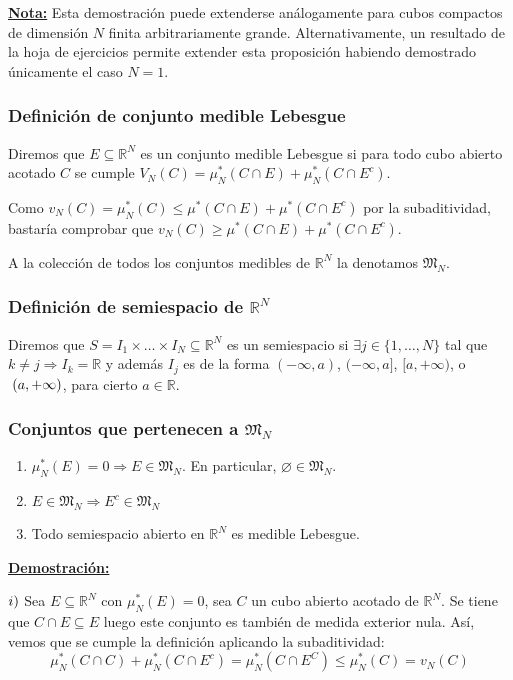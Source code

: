 \documentclass[12pt,a4paper]{article}
\newcommand{\R}{\mathbb{R}}
\newcounter{unit}[section]
\newcounter{chapter}[unit]
\renewcommand{\theunit}{\arabic{unit}}
\renewcommand{\thechapter}{\arabic{chapter}}
\renewcommand{\thesubsubsection}{\theunit.\thechapter.\arabic{subsubsection}}
\newcommand{\result}[1]{%
  \subsubsection{#1}%
  \label{result:\thesubsubsection}
}
\newcommand{\dem}{
    \noindent \underline{\textbf{Demostración:}}
}
\newcommand{\nota}{
    \noindent \underline{\textbf{Nota:}}
}
\begin{document}
\vspace{6mm} %
\nota Esta demostración puede extenderse análogamente para cubos compactos de dimensión $N$ finita arbitrariamente grande. Alternativamente, un resultado de la hoja de ejercicios permite extender esta proposición habiendo demostrado únicamente el caso $N=1$.

\newpage
\result{Definición de conjunto medible Lebesgue}
\hspace{3mm}
Diremos que $E \subseteq \R^N$ es un conjunto medible Lebesgue si para todo cubo abierto acotado $C$ se cumple 
$ V_N(C) = \mu^*_N(C \cap E) + \mu^*_N(C \cap E^c)$.

\vspace{4mm}
Como $v_N(C) = \mu^*_N (C) \leq \mu^*(C \cap E) + \mu^*(C \cap E^c)$ por la subaditividad, bastaría comprobar que $v_N(C) \geq \mu^*(C \cap E) + \mu^*(C\cap E^c)$.

\vspace{4mm} \noindent
A la colección de todos los conjuntos medibles de $\R^N$ la denotamos $\mathfrak{M}_N$.

\vspace{6mm}
\result{Definición de semiespacio de \texorpdfstring{$\R^N$}{R\^N}}
\hspace{3mm}
Diremos que $S = I_1 \times \ldots \times I_N \subseteq \R^N$ es un semiespacio si $\exists j \in \{1,\ldots,N\}$ tal que $k \neq j \Rightarrow I_k = \R$
y además $I_j$ es de la forma $(-\infty, a)$, $(-\infty, a]$, $[a, +\infty)$, o $\hspace{1mm} (a, +\infty)$, para cierto $a \in \R$.

\vspace{6mm}
\result{Conjuntos que pertenecen a \texorpdfstring{$\mathfrak{M}_N$}{M\_N}}
\begin{enumerate}[label=\roman*)]
    \item $\mu^*_N(E) = 0 \Rightarrow E \in \mathfrak{M}_N$. En particular, $\varnothing \in \mathfrak{M}_N$.
    \item $E \in \mathfrak{M}_N \Rightarrow E^c \in \mathfrak{M}_N$
    \item Todo semiespacio abierto en $\R^N$ es medible Lebesgue.
\end{enumerate}
\dem

\vspace{2mm}
$\romannumeral 1)$ Sea $E \subseteq \R^N$ con $\mu^*_N(E) = 0$, sea $C$ un cubo abierto acotado de $\R^N$.
Se tiene que $C \cap E \subseteq E$ luego este conjunto es también de medida exterior nula. Así, vemos que se cumple la definición aplicando la subaditividad: \\[-2ex]
$$\mu^*_N(C \cap C) + \mu^*_N(C \cap E^c) = \mu^*_N(C \cap E^C) \leq \mu^*_N(C) = v_N(C)$$
\end{document}
